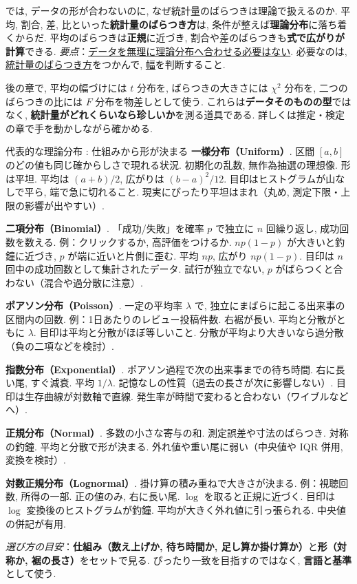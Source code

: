       では, データの形が合わないのに, なぜ統計量のばらつきは理論で扱えるのか.
      平均, 割合, 差, 比といった\textbf{統計量のばらつき方}は, 条件が整えば\textbf{理論分布}に落ち着くからだ.
      平均のばらつきは\textbf{正規}に近づき, 割合や差のばらつきも\textbf{式で広がりが計算}できる.
      \textit{要点}：\underline{データを無理に理論分布へ合わせる必要はない}. 必要なのは, \underline{統計量のばらつき方}をつかんで, \underline{幅}を判断すること.

    \medskip
    後の章で, 平均の幅づけには $t$ 分布を, ばらつきの大きさには $\chi^2$ 分布を, 二つのばらつきの比には $F$ 分布を物差しとして使う.
    これらは\textbf{データそのものの型}ではなく, \textbf{統計量がどれくらいなら珍しいか}を測る道具である. 詳しくは推定・検定の章で手を動かしながら確かめる.

    \begin{mybox}{代表的な理論分布 : 仕組みから形が決まる}
    \textbf{一様分布（Uniform）}.
    区間 $[a,b]$ のどの値も同じ確からしさで現れる状況. 初期化の乱数, 無作為抽選の理想像.
    形は平坦. 平均は $(a+b)/2$, 広がりは $(b-a)^2/12$.
    目印はヒストグラムが山なしで平ら, 端で急に切れること.
    現実にぴったり平坦はまれ（丸め, 測定下限・上限の影響が出やすい）.

    \medskip
    \textbf{二項分布（Binomial）}.
    「成功/失敗」を確率 $p$ で独立に $n$ 回繰り返し, 成功回数を数える. 例：クリックするか, 高評価をつけるか.
    $np(1-p)$ が大きいと釣鐘に近づき, $p$ が端に近いと片側に歪む. 平均 $np$, 広がり $np(1-p)$.
    目印は $n$ 回中の成功回数として集計されたデータ.
    試行が独立でない, $p$ がばらつくと合わない（混合や過分散に注意）.

    \medskip
    \textbf{ポアソン分布（Poisson）}.
    一定の平均率 $\lambda$ で, 独立にまばらに起こる出来事の区間内の回数. 例：1日あたりのレビュー投稿件数.
    右裾が長い. 平均と分散がともに $\lambda$.
    目印は平均と分散がほぼ等しいこと.
    分散が平均より大きいなら過分散（負の二項などを検討）.

    \medskip
    \textbf{指数分布（Exponential）}.
    ポアソン過程で次の出来事までの待ち時間.
    右に長い尾, すぐ減衰. 平均 $1/\lambda$. 記憶なしの性質（過去の長さが次に影響しない）.
    目印は生存曲線が対数軸で直線.
    発生率が時間で変わると合わない（ワイブルなどへ）.

    \medskip
    \textbf{正規分布（Normal）}.
    多数の小さな寄与の和. 測定誤差や寸法のばらつき.
    対称の釣鐘. 平均と分散で形が決まる.
    外れ値や重い尾に弱い（中央値や IQR 併用, 変換を検討）.

    \medskip
    \textbf{対数正規分布（Lognormal）}.
    掛け算の積み重ねで大きさが決まる. 例：視聴回数, 所得の一部.
    正の値のみ, 右に長い尾. $\log$ を取ると正規に近づく.
    目印は $\log$ 変換後のヒストグラムが釣鐘.
    平均が大きく外れ値に引っ張られる. 中央値の併記が有用.

    \medskip
    \noindent \textit{選び方の目安}：\textbf{仕組み（数え上げか, 待ち時間か, 足し算か掛け算か）}と\textbf{形（対称か, 裾の長さ）}をセットで見る.
    ぴったり一致を目指すのではなく, \textbf{言語と基準}として使う.
    \end{mybox}

